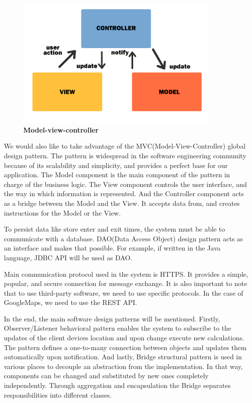  

\begin{figure}[!h]
\centering
\includegraphics[width=0.9\textwidth]{Images/MVC}
\caption{\label{fig:mvc}\textbf{Model-view-controller}}
\end{figure} \newpage

 

We would also like to take advantage of the MVC(Model-View-Controller) global design pattern. The pattern is widespread in the software engineering community because of its scalability and simplicity, and provides a perfect base for our application. The Model component is the main component of the pattern in charge of the business logic. The View component controls the user interface, and the way in which information is represented. And the Controller component acts as a bridge between the Model and the View. It accepts data from, and creates instructions for the Model or the View. \newline


To persist data like store enter and exit times, the system must be able to communicate with a database. DAO(Data Access Object) design pattern acts as an interface and makes that possible. For example, if written in the Java language, JDBC API will be used as DAO. 

 

Main communication protocol used in the system is HTTPS. It provides a simple, popular, and secure connection for message exchange. It is also important to note that to use third-party software, we need to use specific protocols. In the case of GoogleMaps, we need to use the REST API. \newline

 

In the end, the main software design patterns will be mentioned. Firstly, Observer/Listener behavioral pattern enables the system to subscribe to the updates of the client devices location and upon change execute new calculations. The pattern defines a one-to-many connection between objects and updates them automatically upon notification. And lastly, Bridge structural pattern is used in various places to decouple an abstraction from the implementation. In that way, components can be changed and substituted by new ones completely independently. Through aggregation and encapsulation the Bridge separates responsibilities into different classes. 
\newpage
